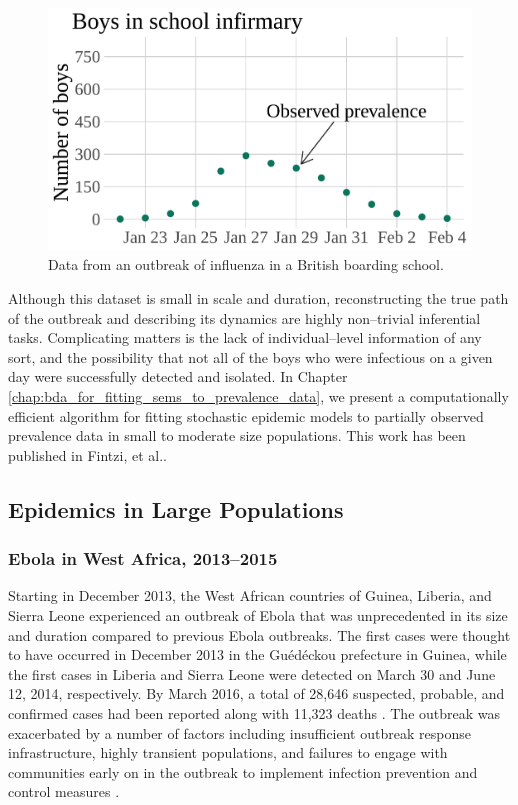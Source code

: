 \begin{figure}[htbp]
	\centering
	\includegraphics[width=0.6\linewidth]{figures/bbs_data}
	\caption{Data from an outbreak of influenza in a British boarding school.}
	\label{fig:bbsdata}
\end{figure}

Although this dataset is small in scale and duration, reconstructing the true path of the outbreak and describing its dynamics are highly non--trivial inferential tasks. Complicating matters is the lack of individual--level information of any sort, and the possibility that not all of the boys who were infectious on a given day were successfully detected and isolated. In Chapter  \ref{chap:bda_for_fitting_sems_to_prevalence_data}, we present a computationally efficient algorithm for fitting stochastic epidemic models to partially observed prevalence data in small to moderate size populations. This work has been published in Fintzi, et al.\cite{fintzi2017efficient}. 

\subsection{Epidemics in Large Populations}
\label{subsec:largepop}

\subsubsection{Ebola in West Africa, 2013--2015}
\label{subsec:ebola_descrip}

Starting in December 2013, the West African countries of Guinea, Liberia, and Sierra Leone experienced an outbreak of Ebola that was unprecedented in its size and duration compared to previous Ebola outbreaks. The first cases were thought to have occurred in December 2013 in the Gu\'{e}d\'{e}ckou prefecture in Guinea, while the first cases in Liberia and Sierra Leone were detected on March 30 and June 12, 2014, respectively. By March 2016, a total of 28,646 suspected, probable, and confirmed cases had been reported along with 11,323 deaths \cite{who2016situation}. The outbreak was exacerbated by a number of factors including insufficient outbreak response infrastructure, highly transient populations, and failures to engage with communities early on in the outbreak to implement infection prevention and control measures \cite{coltart2017ebola,dudas2017virus}. 

